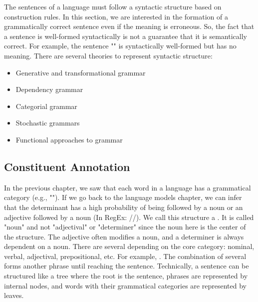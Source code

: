 \documentclass{KodeBook}
\begin{document}
The sentences of a language must follow a syntactic structure based on construction rules.
In this section, we are interested in the formation of a grammatically correct sentence even if the meaning is erroneous.
So, the fact that a sentence is well-formed syntactically is not a guarantee that it is semantically correct.
For example, the sentence "" is syntactically well-formed but has no meaning.
There are several theories to represent syntactic structure:
\begin{itemize}
	\item Generative and transformational grammar
	\item Dependency grammar
	\item Categorial grammar
	\item Stochastic grammars
	\item Functional approaches to grammar
\end{itemize}


\subsection{Constituent Annotation}

In the previous chapter, we saw that each word in a language has a grammatical category (e.g., ""). 
If we go back to the language models chapter, we can infer that the determinant has a high probability of being followed by a noun or an adjective followed by a noun (In RegEx: //). 
We call this structure a . 
It is called "noun" and not "adjectival" or "determiner" since the noun here is the center of the structure. 
The adjective often modifies a noun, and a determiner is always dependent on a noun. 
There are several  depending on the core category: nominal, verbal, adjectival, prepositional, etc. 
For example, . 
The combination of several  forms another phrase until reaching the sentence. 
Technically, a sentence can be structured like a tree where the root is the sentence, phrases are represented by internal nodes, and words with their grammatical categories are represented by leaves.
\end{document}

